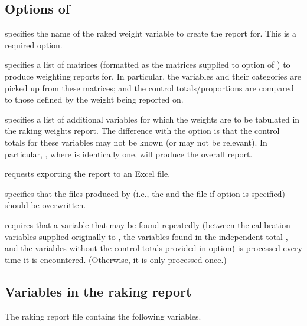 \subsection{Options of }

\hangpara
{} specifies the name of the raked weight variable to create
    the report for. This is a required option.

\hangpara
{} specifies a list of matrices (formatted as the matrices
    supplied to  option of ) to produce weighting reports for.
    In particular, the variables and their categories are picked up from these matrices;
    and the control totals/proportions are compared to those defined by the weight being reported on.

\hangpara
{} specifies a list of additional variables for which the weights are to
    be tabulated in the raking weights report. The difference with the  option
    is that the control totals for these variables may not be known (or may not be relevant).
    In particular, , where  is identically one, will produce
    the overall report.

\hangpara
{} requests exporting the report to an Excel file.

\hangpara
{} specifies that the files produced by  (i.e., the 
    and the {} file if  option is specified) should be overwritten.

\hangpara
{} requires that a variable that may be found repeatedly (between the calibration variables
    supplied originally to , the variables found in the independent total ,
    and the variables without the control totals provided in  option) is processed every
    time it is encountered. (Otherwise, it is only processed once.)

\subsection{Variables in the raking report}

The raking report file contains the following variables.

\cnp

